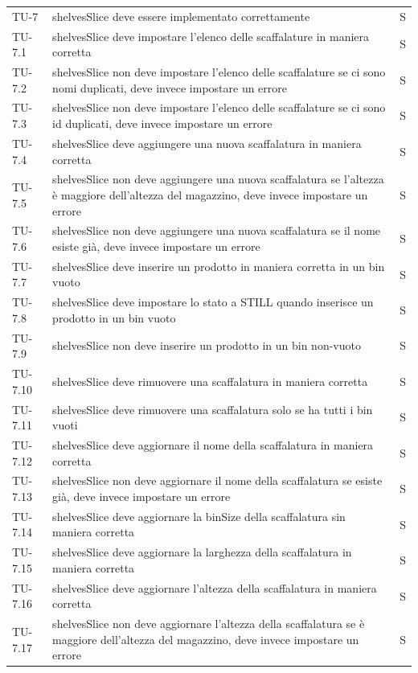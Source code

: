 \begin{xltabular}{0.9\textwidth}{X | p{0.6\textwidth} | p{0.1\textwidth} }
    TU-7 & shelvesSlice deve essere implementato correttamente & S\\
    TU-7.1 & shelvesSlice deve impostare l'elenco delle scaffalature in maniera corretta & S\\
    TU-7.2 & shelvesSlice non deve impostare l'elenco delle scaffalature se ci sono nomi duplicati, deve invece impostare un errore & S\\
    TU-7.3 & shelvesSlice non deve impostare l'elenco delle scaffalature se ci sono id duplicati, deve invece impostare un errore & S\\
    TU-7.4 & shelvesSlice deve aggiungere una nuova scaffalatura in maniera corretta & S\\
    TU-7.5 & shelvesSlice non deve aggiungere una nuova scaffalatura se l'altezza è maggiore dell'altezza del magazzino, deve invece impostare un errore & S\\
    TU-7.6 & shelvesSlice non deve aggiungere una nuova scaffalatura se il nome esiste già, deve invece impostare un errore & S\\
    TU-7.7 & shelvesSlice deve inserire un prodotto in maniera corretta in un bin vuoto & S\\
    TU-7.8 & shelvesSlice deve impostare lo stato a STILL quando inserisce un prodotto in un bin vuoto & S\\
    TU-7.9 & shelvesSlice non deve inserire un prodotto in un bin non-vuoto & S\\
    TU-7.10 & shelvesSlice deve rimuovere una scaffalatura in maniera corretta & S\\
    TU-7.11 & shelvesSlice deve rimuovere una scaffalatura solo se ha tutti i  bin vuoti & S\\
    TU-7.12 & shelvesSlice deve aggiornare il nome della scaffalatura in maniera corretta & S\\
    TU-7.13 & shelvesSlice non deve aggiornare il nome della scaffalatura se esiste già, deve invece impostare un errore & S\\
    TU-7.14 & shelvesSlice deve aggiornare la binSize della scaffalatura sin maniera corretta& S\\
    TU-7.15 & shelvesSlice deve aggiornare la larghezza della scaffalatura in maniera corretta & S\\
    TU-7.16 & shelvesSlice deve aggiornare l'altezza della scaffalatura in maniera corretta & S\\
    TU-7.17 & shelvesSlice non deve aggiornare l'altezza della scaffalatura se è maggiore dell'altezza del magazzino, deve invece impostare un errore & S\\

\end{xltabular}
